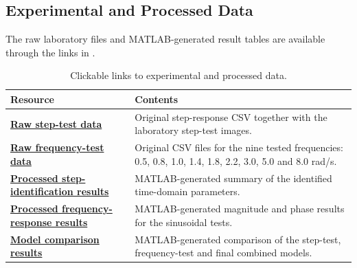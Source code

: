 \documentclass[12pt,a4paper]{article}
\newcommand{\stepdataurl}{
https://github.com/NateDogg247/EEE3094S---Lab1-System-Identification/tree/main/Data/Step\%20Test
}
\newcommand{\freqdataurl}{
https://github.com/NateDogg247/EEE3094S---Lab1-System-Identification/tree/main/Data/Frequency\%20Test
}
\newcommand{\stepprocessedurl}{
https://github.com/NateDogg247/EEE3094S---Lab1-System-Identification/blob/main/Data/step_test/step_identification_results.csv
}
\newcommand{\freqprocessedurl}{
https://github.com/NateDogg247/EEE3094S---Lab1-System-Identification/blob/main/Data/frequency_test/frequency_results_matlab.csv
}
\newcommand{\modelcomparisonurl}{
https://github.com/NateDogg247/EEE3094S---Lab1-System-Identification/blob/main/Data/frequency_test/model_comparison_matlab.csv
}
\begin{document}
\newpage

\subsection{Experimental and Processed Data}

The raw laboratory files and MATLAB-generated result tables are
available through the links in .

\begin{table}[H]
    \centering
    \caption{Clickable links to experimental and processed data.}
    \label{tab:datalinks}

    \renewcommand{\arraystretch}{1.35}

    \begin{tabular}{
        |>{\raggedright\arraybackslash}p{}
        |>{\raggedright\arraybackslash}p{}|
    }
        \hline

        \rowcolor{gray!15}
        \textbf{Resource} &
        \textbf{Contents} \\

        \hline

        \href{\stepdataurl}{
            \textbf{Raw step-test data}
        }
        &
        Original step-response CSV together with the laboratory
        step-test images. \\

        \hline

        \href{\freqdataurl}{
            \textbf{Raw frequency-test data}
        }
        &
        Original CSV files for the nine tested frequencies:
        0.5, 0.8, 1.0, 1.4, 1.8, 2.2, 3.0, 5.0 and 8.0 rad/s. \\

        \hline

        \href{\stepprocessedurl}{
            \textbf{Processed step-identification results}
        }
        &
        MATLAB-generated summary of the identified time-domain
        parameters. \\

        \hline

        \href{\freqprocessedurl}{
            \textbf{Processed frequency-response results}
        }
        &
        MATLAB-generated magnitude and phase results for the
        sinusoidal tests. \\

        \hline

        \href{\modelcomparisonurl}{
            \textbf{Model comparison results}
        }
        &
        MATLAB-generated comparison of the step-test, frequency-test
        and final combined models. \\

        \hline
    \end{tabular}
\end{table}
\end{document}
